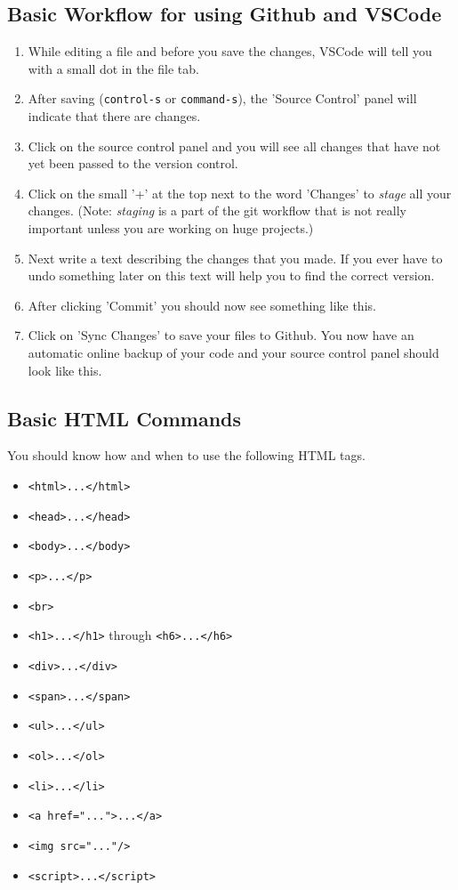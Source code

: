 \documentclass[english,11pt,a4paper]{report}
\begin{document}
\subsection{Basic Workflow for using Github and VSCode}
\begin{enumerate}
    \item While editing a file and before you save the changes, VSCode will tell you with a small dot in the file tab.
    \item After saving (\verb|control-s| or \verb|command-s|), the 'Source Control' panel will indicate that there are changes.
    \item Click on the source control panel and you will see all changes that have not yet been passed to the version control.
    \item Click on the small '+' at the top next to the word 'Changes' to \emph{stage} all your changes. (Note: \emph{staging} is a part of the git workflow that is not really important unless you are working on huge projects.)
    \item Next write a text describing the changes that you made. If you ever have to undo something later on this text will help you to find the correct version.
    \newpage
    \item After clicking 'Commit' you should now see something like this.
    \item Click on 'Sync Changes' to save your files to Github. You now have an automatic online backup of your code and your source control panel should look like this.
\end{enumerate}

\newpage
\subsection{Basic HTML Commands}
You should know how and when to use the following HTML tags.
\begin{itemize}
    \item \verb|<html>...</html>|
    \item \verb|<head>...</head>|
    \item \verb|<body>...</body>|
    \item \lstinline|<p>...</p>|
    \item \lstinline|<br>|
    \item \lstinline|<h1>...</h1>| through \lstinline|<h6>...</h6>|
    \item \lstinline|<div>...</div>|
    \item \lstinline|<span>...</span>|
    \item \lstinline|<ul>...</ul>|
    \item \lstinline|<ol>...</ol>|
    \item \lstinline|<li>...</li>|
    \item \verb|<a href="...">...</a>|
    \item \verb|<img src="..."/>|
    \item \verb|<script>...</script>|
\end{itemize}
\end{document}
